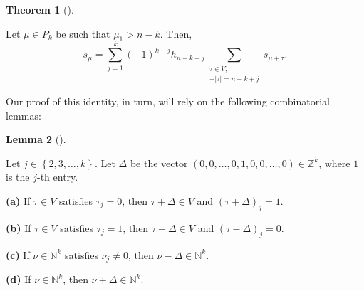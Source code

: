 \documentclass[numbers=enddot,12pt,final,onecolumn,notitlepage]{scrartcl}%
\theoremstyle{definition}
\newtheorem{theo}{Theorem}[section]
\newenvironment{theorem}[1][]
{\begin{theo}[#1]\begin{leftbar}}
{\end{leftbar}\end{theo}}
\newtheorem{lem}[theo]{Lemma}
\newenvironment{lemma}[1][]
{\begin{lem}[#1]\begin{leftbar}}
{\end{leftbar}\end{lem}}
\let\sumnonlimits\sum
\renewcommand{\sum}{\sumnonlimits\limits}
\begin{document}
\begin{theorem}
\label{thm.rimhook-S}Let $\mu\in P_{k}$ be such that $\mu_{1}>n-k$. Then,%
\[
s_{\mu}=\sum_{j=1}^{k}\left(  -1\right)  ^{k-j}h_{n-k+j}\sum_{\substack{\tau
\in V;\\-\left\vert \tau\right\vert =n-k+j}}s_{\mu+\tau}.
\]

\end{theorem}

Our proof of this identity, in turn, will rely on the following combinatorial lemmas:

\begin{lemma}
\label{lem.rimhook-S.sum0lem}Let $j\in\left\{  2,3,\ldots,k\right\}  $. Let
$\Delta$ be the vector $\left(  0,0,\ldots,0,1,0,0,\ldots,0\right)
\in\mathbb{Z}^{k}$, where $1$ is the $j$-th entry.

\textbf{(a)} If $\tau\in V$ satisfies $\tau_{j}=0$, then $\tau+\Delta\in V$
and $\left(  \tau+\Delta\right)  _{j}=1$.

\textbf{(b)} If $\tau\in V$ satisfies $\tau_{j}=1$, then $\tau-\Delta\in V$
and $\left(  \tau-\Delta\right)  _{j}=0$.

\textbf{(c)} If $\nu\in\mathbb{N}^{k}$ satisfies $\nu_{j}\neq0$, then
$\nu-\Delta\in\mathbb{N}^{k}$.

\textbf{(d)} If $\nu\in\mathbb{N}^{k}$, then $\nu+\Delta\in\mathbb{N}^{k}$.
\end{lemma}
\end{document}
